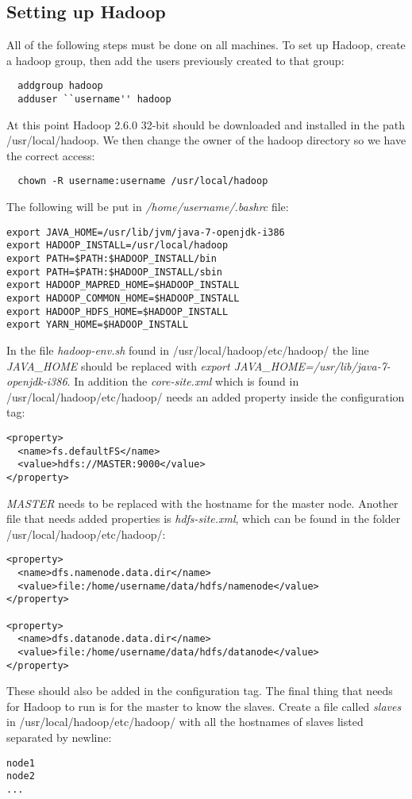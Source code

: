 \subsection{Setting up Hadoop}
All of the following steps must be done on all machines. To set up Hadoop, create a hadoop group, then add the users previously created to that group:
\begin{verbatim}
  addgroup hadoop
  adduser ``username'' hadoop
\end{verbatim}
At this point Hadoop 2.6.0 32-bit should be downloaded and installed in the path \textsf{/usr/local/hadoop}. We then change the owner of the hadoop directory so we have the correct access:
\begin{verbatim}
  chown -R username:username /usr/local/hadoop
\end{verbatim}
The following will be put in \emph{/home/username/.bashrc} file:
\begin{verbatim}
export JAVA_HOME=/usr/lib/jvm/java-7-openjdk-i386
export HADOOP_INSTALL=/usr/local/hadoop
export PATH=$PATH:$HADOOP_INSTALL/bin
export PATH=$PATH:$HADOOP_INSTALL/sbin
export HADOOP_MAPRED_HOME=$HADOOP_INSTALL
export HADOOP_COMMON_HOME=$HADOOP_INSTALL
export HADOOP_HDFS_HOME=$HADOOP_INSTALL
export YARN_HOME=$HADOOP_INSTALL
\end{verbatim}
In the file \emph{hadoop-env.sh} found in \textsf{/usr/local/hadoop/etc/hadoop/} the line \emph{JAVA\_HOME} should be replaced with \emph{export JAVA\_HOME=/usr/lib/java-7-openjdk-i386}.
In addition the \emph{core-site.xml} which is found in \textsf{/usr/local/hadoop/etc/hadoop/} needs an added property inside the configuration tag: 
\begin{verbatim}
<property>
  <name>fs.defaultFS</name>
  <value>hdfs://MASTER:9000</value>
</property>
\end{verbatim}
\emph{MASTER} needs to be replaced with the hostname for the master node. Another file that needs added properties is \emph{hdfs-site.xml}, which can be found in the folder \textsf{/usr/local/hadoop/etc/hadoop/}:
\begin{verbatim}
<property>
  <name>dfs.namenode.data.dir</name>
  <value>file:/home/username/data/hdfs/namenode</value>
</property>

<property>
  <name>dfs.datanode.data.dir</name>
  <value>file:/home/username/data/hdfs/datanode</value>
</property>
\end{verbatim}
These should also be added in the configuration tag.
The final thing that needs for Hadoop to run is for the master to know the slaves. Create a file called \emph{slaves} in \textsf{/usr/local/hadoop/etc/hadoop/} with all the hostnames of slaves listed separated by newline:
\begin{verbatim}
node1
node2
...
\end{verbatim}


